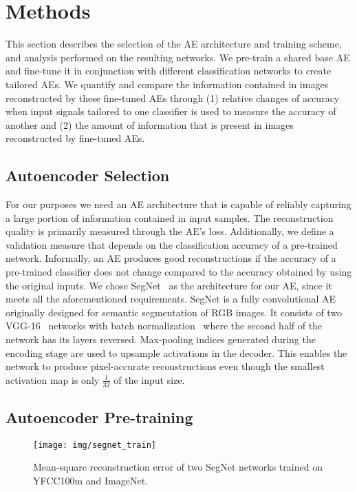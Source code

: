 \documentclass[10pt,twocolumn,a4paper]{article}
\begin{document}
\section{Methods}
This section describes the selection of the AE architecture and training scheme, and analysis performed on the resulting networks.
We pre-train a shared base AE and fine-tune it in conjunction with different classification networks to create tailored AEs.
We quantify and compare the information contained in images reconstructed by these fine-tuned AEs through
(1) relative changes of accuracy when input signals tailored to one classifier is used to measure the accuracy of another and (2) the amount of information that is present in images reconstructed by fine-tuned AEs.


\subsection{Autoencoder Selection}
For our purposes we need an AE architecture that is capable of reliably capturing a large portion of information contained in input samples.
The reconstruction quality is primarily measured through the AE's loss.
Additionally, we define a validation measure that depends on the classification accuracy of a pre-trained network.
Informally, an AE produces good reconstructions if the accuracy of a pre-trained classifier does not change compared to the accuracy obtained by using the original inputs.
We chose SegNet~\cite{badrinarayanan2015segnet2} as the architecture for our AE, since it meets all the aforementioned requirements.
SegNet is a fully convolutional AE originally designed for semantic segmentation of RGB images.
It consists of two VGG-16~\cite{Simonyan14c} networks with batch normalization~\cite{ioffe2015batch} where the second half of the network has its layers reversed.
Max-pooling indices generated during the encoding stage are used to upsample activations in the decoder.
This enables the network to produce pixel-accurate reconstructions even though the smallest activation map is only $\frac{1}{32}$ of the input size.

\subsection{Autoencoder Pre-training}\begin{figure}
	\texttt{[image: img/segnet\_train]}
	\caption{Mean-square reconstruction error of two SegNet networks trained on YFCC100m and ImageNet.}
	\label{fig:ae-training}
\end{figure}
\end{document}
